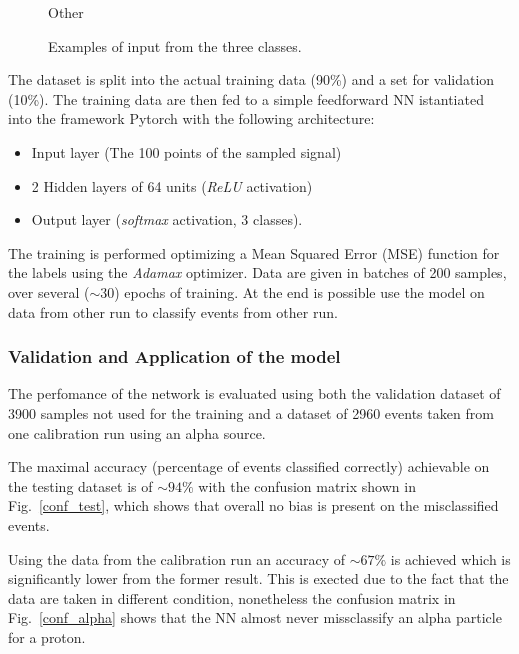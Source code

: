 \begin{figure}[htb]
\begin{minipage}[b]{0.45\textwidth}
  \caption{Other}
  \end{minipage}
  \caption{Examples of input from the three classes.}
  \label{input}
\end{figure}

The dataset is split into the actual training data (\num{90}\%) and a set for validation (\num{10}\%). The training data are then fed to a simple feedforward NN istantiated into the framework Pytorch with the following architecture:

\begin{itemize}
	\item Input layer (The \num{100} points of the sampled signal)
	\item 2 Hidden layers of 64 units (\emph{ReLU} activation)
	\item Output layer (\emph{softmax} activation, 3 classes).
\end{itemize}

The training is performed optimizing a Mean Squared Error (MSE) function for the labels using the \emph{Adamax} optimizer. Data are given in batches of 200 samples, over several ($\sim 30$) epochs of training. At the end is possible use the model on data from other run to classify events from other run.

\subsubsection{Validation and Application of the model}

The perfomance of the network is evaluated using both the validation dataset of \num{3900} samples not used for the training and a dataset of 2960 events taken from one calibration run using an alpha source.


The maximal accuracy (percentage of events classified correctly) achievable on the testing dataset is of $\sim\num{94} \%$ with the confusion matrix shown in Fig.~\ref{conf_test}, which shows that overall no bias is present on the misclassified events.


Using the data from the calibration run an accuracy of $\sim\num{67} \%$ is achieved which is significantly lower from the former result. This is exected due to the fact that the data are taken in different condition, nonetheless the confusion matrix in Fig.~\ref{conf_alpha} shows that the NN almost never missclassify an alpha particle for a proton.

